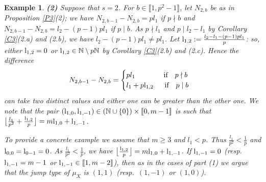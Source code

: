 \documentclass[11pt]{amsart}
\newtheorem{ex}[theorem]{Example}
\def\l{\textup{l}}
\begin{document}
\begin{ex}
\smallskip
{\bf (2)} Suppose that $s=2$. For $b\in\llbracket1,p^2-1\rrbracket$, let $N_{2,b}$ be as in Proposition \ref{P3}(2); we have $N_{2,b-1}-N_{2,b}=pl_1$ if $p\nmid b$ and $N_{2,b-1}-N_{2,b}=l_2-(p-1)pl_1$ if $p\mid b$.  As $p\nmid l_1$ and $p\mid l_2-l_1$ by Corollary \ref{C3}(2.a) and (2.b), we have $l_2-(p-1)pl_1\neq pl_1$. Let $\l_{1,2}:=\frac{l_2-l_1-(p-1)pl_1}{p}$: so, either $\l_{1,2}=0$ or $\l_{1,2}\in\mathbb N\setminus p\mathbb N$ by Corollary \ref{C3}(2.b) and (2.c). Hence the difference
$$N_{2,b-1}-N_{2,b}=\begin{cases}pl_1\quad\quad\quad\quad\textup{if}\quad p\nmid b\\
l_1+p\l_{1,2}\quad\;\;\textup{if}\quad p\mid b\end{cases}$$
can take two distinct values and either one can be greater than the other one. We note that the pair $(\l_{1,0},\l_{1,-1})\in (\mathbb N\cup\{0\})\times\llbracket0,m-1\rrbracket$ is such that $\big\lfloor\frac{l_1}{p^2}+\frac{\l_{1,2}}{p}\big\rfloor=m\l_{1,0}+\l_{1,-1}$.

To provide a concrete example we assume that $m\ge 3$ and $l_1<p$. Thus $\frac{l_1}{p^2}<\frac{1}{p}$ and $\l_{0,0}=\l_{0-1}=0$. As $\frac{l_1}{p^2}<\frac{1}{p}$, we have $\big\lfloor\frac{\l_{1,2}}{p}\big\rfloor=m\l_{1,0}+\l_{1,-1}$. If $\l_{1,-1}=0$ (resp.\ $\l_{1,-1}=m-1$ or $\l_{1,-1}\in\llbracket1,m-2\rrbracket$), then as in the cases of part (1) we argue that the jump type of $\mu_X$ is $(1,1)$ (resp.\ $(1,-1)$ or $(1,0)$).\end{ex}
\end{document}
